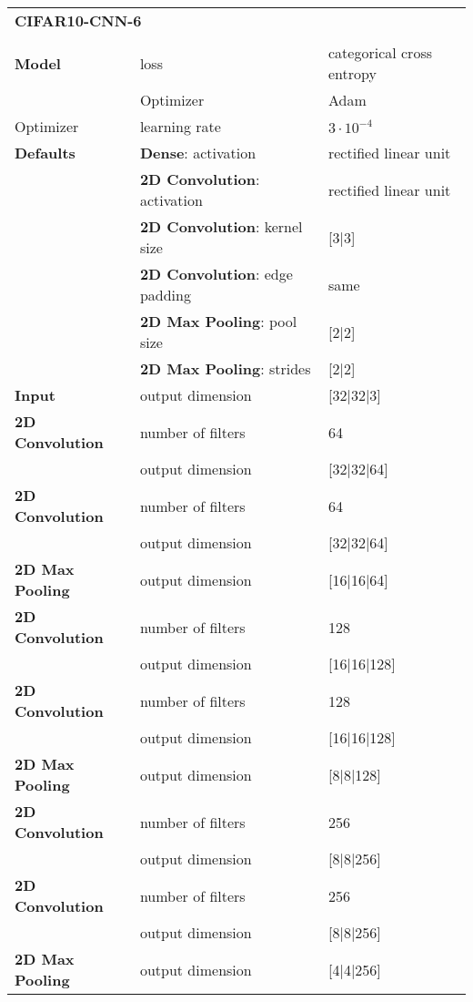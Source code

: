 	\begin{tabularx}{\textwidth}[!h]{X X X}
		\multicolumn{3}{X}{\textbf{CIFAR10-CNN-6}}\\
		\\
		\hline
		\endhead
		\textbf{Model} & loss & categorical cross entropy\\
		& Optimizer & Adam\\
		Optimizer & learning rate & $3 \cdot 10^{-4}$\\
		\hline
		\textbf{Defaults} & \textbf{Dense}: activation & rectified linear unit\\
		& \textbf{2D Convolution}: activation & rectified linear unit\\
		& \textbf{2D Convolution}: kernel size & [3|3]\\
		& \textbf{2D Convolution}: edge padding & same\\
		& \textbf{2D Max Pooling}: pool size & [2|2]\\
		& \textbf{2D Max Pooling}: strides & [2|2]\\
		\hline
		\textbf{Input} & output dimension & [32|32|3]\\
		[8pt]
		\textbf{2D Convolution} & number of filters & 64\\
		& output dimension & [32|32|64]\\
		[8pt]
		\textbf{2D Convolution} & number of filters & 64\\
		& output dimension & [32|32|64]\\
		[8pt]
		\textbf{2D Max Pooling} & output dimension & [16|16|64]\\
		[8pt]
		\textbf{2D Convolution} & number of filters & 128\\
		& output dimension & [16|16|128]\\
		[8pt]
		\textbf{2D Convolution} & number of filters & 128\\
		& output dimension & [16|16|128]\\
		[8pt]
		\textbf{2D Max Pooling} & output dimension & [8|8|128]\\
		[8pt]
		\textbf{2D Convolution} & number of filters & 256\\
		& output dimension & [8|8|256]\\
		[8pt]
		\textbf{2D Convolution} & number of filters & 256\\
		& output dimension & [8|8|256]\\
		[8pt]
		\textbf{2D Max Pooling} & output dimension & [4|4|256]\\

\end{tabularx}
